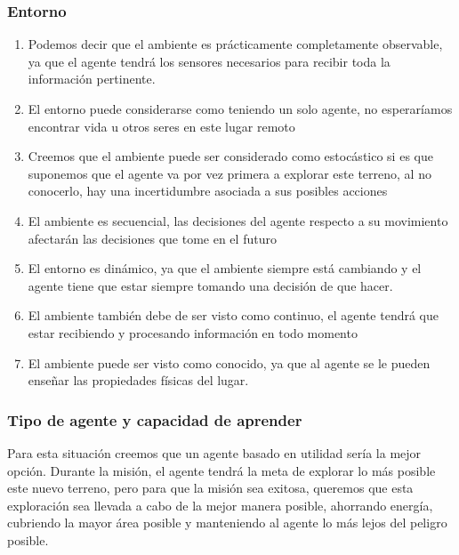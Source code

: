 \documentclass{article}
\begin{document}
            \subsubsection{Entorno}
                \begin{enumerate}
                    \item Podemos decir que el ambiente es prácticamente completamente  observable, ya que el agente tendrá los sensores necesarios para recibir toda la información pertinente.
                    \item El entorno puede considerarse como teniendo un solo agente, no esperaríamos encontrar vida u otros seres en este lugar remoto
                    \item Creemos que el ambiente puede ser considerado como estocástico si es que suponemos que el agente va por vez primera a explorar este terreno, al no conocerlo, hay una incertidumbre asociada a sus posibles acciones
                    \item El ambiente es secuencial, las decisiones del agente respecto a su movimiento afectarán las decisiones que tome en el futuro
                    \item El entorno es dinámico, ya que el ambiente siempre está cambiando y el agente tiene que estar siempre tomando una decisión de que hacer. 
                    \item El ambiente también debe de ser visto como continuo, el agente tendrá que estar recibiendo y procesando información en todo momento
                    \item El ambiente puede ser visto como conocido, ya que al agente se le pueden enseñar las propiedades físicas del lugar.
                \end{enumerate}

            \subsubsection{Tipo de agente y capacidad de aprender}
                Para esta situación creemos que un agente basado en utilidad sería la mejor opción. Durante la misión, el agente tendrá la meta de explorar lo más posible este nuevo terreno, pero para que la misión sea exitosa, queremos que esta exploración sea llevada a cabo de la mejor manera posible, ahorrando energía, cubriendo la mayor área posible y manteniendo al agente lo más lejos del peligro posible.
\end{document}
